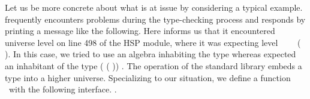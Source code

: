 \ifshort\else
Let us be more concrete about what is at issue by considering a typical example. \agda
frequently encounters problems during the type-checking process and responds by printing a
message like the following.
{\color{red}{\small
\begin{verbatim}
  HSP.lagda:498,20-23
  α != 𝓞 ⊔ 𝓥 ⊔ (lsuc α) when checking that... has type...
\end{verbatim}}}
\noindent Here \agda informs us that it encountered universe level  on line 498 of
the HSP module, where it was expecting level ~~~~(
). In this case, we tried to use an algebra inhabiting the type 
  whereas \agda expected an inhabitant of the type  (
   ( )) .
\fi
The  operation of the standard library embeds a type into a higher universe.
Specializing  to our situation, we
define a function %
\ifshort
~with the following interface.
\vskip-2mm
\else
.

